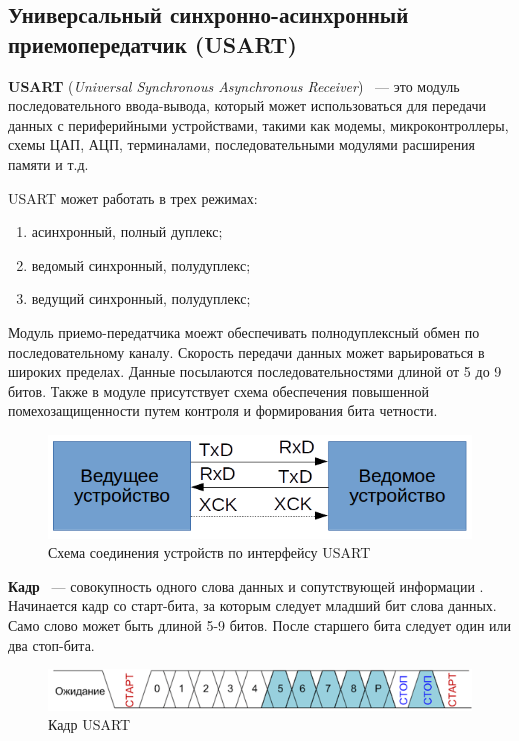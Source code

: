 \fi

\subsection{Универсальный синхронно-асинхронный\\ приемопередатчик (USART)}

\textbf{USART} (\textit{Universal Synchronous Asynchronous Receiver}) ~--- это модуль последовательного ввода-вывода, который может использоваться для передачи данных с периферийными устройствами, такими как модемы, микроконтроллеры, схемы ЦАП, АЦП, терминалами, последовательными модулями расширения памяти и т.д. \cite{usart1}

USART может работать в трех режимах:
\begin{enumerate}
\item асинхронный, полный дуплекс;
\item ведомый синхронный, полудуплекс;
\item ведущий синхронный, полудуплекс;
\end{enumerate}

Модуль приемо-передатчика моежт обеспечивать полнодуплексный обмен по последовательному каналу. Скорость передачи данных может варьироваться в широких пределах. Данные посылаются последовательностями длиной от 5 до 9 битов. Также в модуле присутствует схема обеспечения повышенной помехозащищенности путем контроля и формирования бита четности.

\begin{figure}[H]
	\label{usartscheme}
	\centering
		\includegraphics[scale=0.8]{img/usartscheme.png}
	\caption{Схема соединения устройств по интерфейсу USART}
\end{figure}

\textbf{Кадр} ~--- совокупность одного слова данных и сопутствующей информации \cite{usart1}. Начинается кадр со старт-бита, за которым следует младший бит слова данных. Само слово может быть длиной 5-9 битов. После 
старшего бита следует один или два стоп-бита.

\begin{figure}[H]
	\label{usartframe}
	\centering
		\includegraphics[scale=0.8]{img/usartframe.png}
	\caption{Кадр USART\cite{usart1}}
\end{figure}

